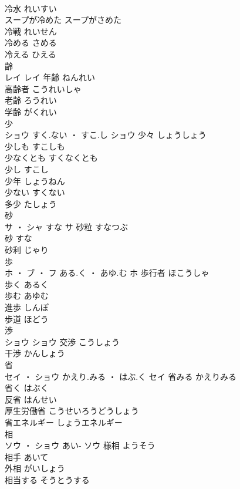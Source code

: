 \documentclass[8pt]{extreport}
\begin{document}
\begin{CJK}{UTF8}{min}
\\	冷水	れいすい	
\\	スープが冷めた	スープがさめた	
\\	冷戦	れいせん	
\\	冷める	さめる	
\\	冷える	ひえる	
\\	齢	
\\	レイ		レイ	年齢	ねんれい	
\\	高齢者	こうれいしゃ	
\\	老齢	ろうれい	
\\	学齢	がくれい	
\\	少	
\\	ショウ	すく.ない ・ すこ.し	ショウ	少々	しょうしょう	
\\	少しも	すこしも	
\\	少なくとも	すくなくとも	
\\	少し	すこし	
\\	少年	しょうねん	
\\	少ない	すくない	
\\	多少	たしょう	
\\	砂	
\\	サ ・ シャ	すな	サ													砂粒	すなつぶ	
\\	砂	すな	
\\	砂利	じゃり	
\\	歩	
\\	ホ ・ ブ ・ フ	ある.く ・ あゆ.む	ホ	歩行者	ほこうしゃ	
\\	歩く	あるく	
\\	歩む	あゆむ	
\\	進歩	しんぽ	
\\	歩道	ほどう	
\\	渉	
\\	ショウ		ショウ	交渉	こうしょう	
\\	干渉	かんしょう	
\\	省	
\\	セイ ・ ショウ	かえり.みる ・ はぶ.く	セイ	省みる	かえりみる	
\\	省く	はぶく	
\\	反省	はんせい	
\\	厚生労働省	こうせいろうどうしょう	
\\	省エネルギー	しょうエネルギー	
\\	相	
\\	ソウ ・ ショウ	あい-	ソウ	様相	ようそう	
\\	相手	あいて	
\\	外相	がいしょう	
\\	相当する	そうとうする	

\end{CJK}
\end{document}
